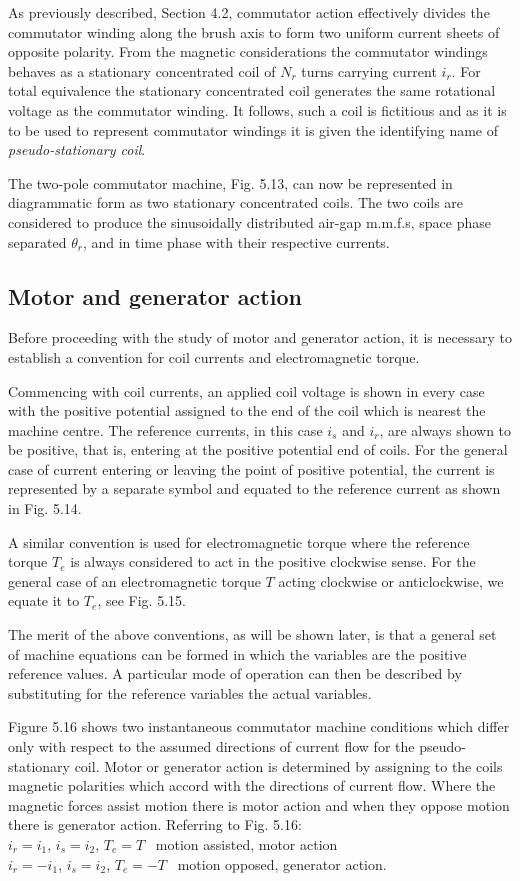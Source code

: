 \documentclass[a4paper,numbers=noenddot,12pt]{scrbook}
\begin{document}
As previously described, Section 4.2, commutator action effectively divides the commutator winding along the brush axis to form two uniform current sheets of opposite polarity. From the magnetic considerations the commutator windings behaves as a stationary concentrated coil of $N_r$ turns carrying current $i_r$. For total equivalence the stationary concentrated coil generates the same rotational voltage as the commutator winding. It follows, such a coil is fictitious and as it is to be used to represent commutator  windings it is given the identifying name of \emph{pseudo-stationary coil}.

The two-pole commutator machine, Fig. 5.13, can now be represented in diagrammatic form as two stationary concentrated coils. The two coils are considered to produce the sinusoidally distributed air-gap m.m.f.s, space phase separated $\theta_r$, and in time phase with their respective currents.

\subsection{Motor and generator action} Before proceeding with the study of motor and generator action, it is necessary to establish a convention for coil currents and electromagnetic torque.

Commencing with coil currents, an applied coil voltage is shown in every case with the positive potential assigned to the end of the coil which is nearest the machine centre. The reference currents, in this case $i_s$ and $i_r$, are always shown to be positive, that is, entering at the positive potential end of coils. For the general case of current entering or leaving the point of positive potential, the current is represented by a separate symbol and equated to the reference current as shown in Fig. 5.14.

A similar convention is used for electromagnetic torque where the reference torque $T_e$ is always considered to act in the positive clockwise sense. For the general case of an electromagnetic torque $T$ acting clockwise or anticlockwise, we equate it to $T_e$, see Fig. 5.15.

The merit of the above conventions, as will be shown later, is that a general set of machine equations can be formed in which the variables are the positive reference values. A particular mode of operation can then be described by substituting for the reference variables the actual variables.

Figure 5.16 shows two instantaneous commutator machine conditions which differ only with respect to the assumed directions of current flow for the pseudo-stationary coil. Motor or generator action is determined by assigning to the coils magnetic polarities which accord with the directions of current flow. Where the magnetic forces assist motion there is motor action and when they oppose motion there is generator action. Referring to Fig. 5.16:\\
\TabPositions{0cm,2cm,4cm,6cm}
$i_r = i_1$, \tab$i_s = i_2$, \tab$T_e = T$ \tab\ motion assisted, motor action \\
$i_r = - i_1$, \tab$i_s = i_2$, \tab$T_e = - T$ \tab\ motion opposed, generator action.
\end{document}
